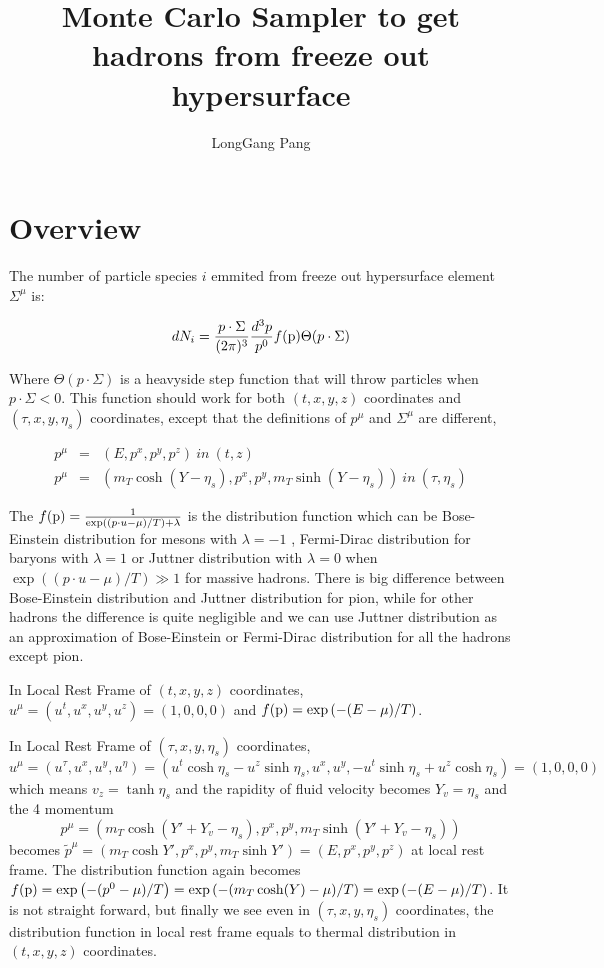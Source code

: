\documentclass[11pt, oneside]{article}   	%
\title{Monte Carlo Sampler to get hadrons from freeze out hypersurface}
\author{LongGang Pang}
\begin{document}
\maketitle
\section{Overview}

The number of particle species $i$ emmited from freeze out hypersurface
element $\Sigma^{\mu}$ is:

\[
dN_{i}=\frac{p\cdot\Sigma}{(2\pi)^{3}}\frac{d^{3}p}{p^{0}}f({\rm p})\Theta(p\cdot\Sigma)
\]


Where $\Theta(p\cdot\Sigma)$ is a heavyside step function that will
throw particles when $p\cdot\Sigma<0$. This function should work
for both $(t,x,y,z)$ coordinates and $(\tau,x,y,\eta_{s})$ coordinates,
except that the definitions of $p^{\mu}$ and $\Sigma^{\mu}$ are
different,

\begin{eqnarray*}
p^{\mu} & = & (E,p^{x},p^{y},p^{z})\ in\ (t,z)\\
p^{\mu} & = & (m_{T}\cosh(Y-\eta_{s}),p^{x},p^{y},m_{T}\sinh(Y-\eta_{s}))\ in\ (\tau,\eta_{s})
\end{eqnarray*}


The $f({\rm p})=\frac{1}{\exp((p\cdot u-\mu)/T)+\lambda}$ is the
distribution function which can be Bose-Einstein distribution for
mesons with $\lambda=-1$ , Fermi-Dirac distribution for baryons with
$\lambda=1$ or Juttner distribution with $\lambda=0$ when $\exp((p\cdot u-\mu)/T)\gg1$
for massive hadrons. There is big difference between Bose-Einstein
distribution and Juttner distribution for pion, while for other hadrons
the difference is quite negligible and we can use Juttner distribution
as an approximation of Bose-Einstein or Fermi-Dirac distribution for
all the hadrons except pion. 

In Local Rest Frame of $(t,x,y,z)$ coordinates, $u^{\mu}=(u^{t},u^{x},u^{y},u^{z})=(1,0,0,0)$
and $f({\rm p})=\exp\left(-(E-\mu)/T\right)$.

In Local Rest Frame of $(\tau,x,y,\eta_{s})$ coordinates, 
\[
u^{\mu}=(u^{\tau},u^{x},u^{y},u^{\eta})=\left(u^{t}\cosh\eta_{s}-u^{z}\sinh\eta_{s},u^{x},u^{y},-u^{t}\sinh\eta_{s}+u^{z}\cosh\eta_{s}\right)=(1,0,0,0)
\]
which means $v_{z}=\tanh\eta_{s}$ and the rapidity of fluid velocity
becomes $Y_{v}=\eta_{s}$ and the 4 momentum 
\[
p^{\mu}=(m_{T}\cosh(Y'+Y_{v}-\eta_{s}),p^{x},p^{y},m_{T}\sinh(Y'+Y_{v}-\eta_{s}))
\]
becomes $\tilde{p}^{\mu}=(m_{T}\cosh Y',p^{x},p^{y},m_{T}\sinh Y')=(E,p^{x},p^{y},p^{z})$
at local rest frame. 
The distribution function again becomes 
$f({\rm p})=\exp\left(-(p^{0}-\mu)/T\right)=\exp\left(-(m_{T}\cosh(Y)-\mu)/T\right)=\exp\left(-(E-\mu)/T\right)$.
It is not straight forward, but finally we see even in $(\tau,x,y,\eta_{s})$
coordinates, the distribution function in local rest frame equals
to thermal distribution in $(t,x,y,z)$ coordinates. 
\end{document}

